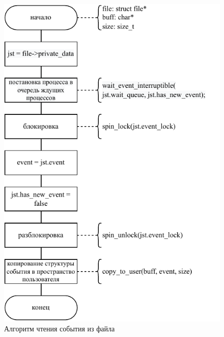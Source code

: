 \begin{figure}[ht]
    \centering
    \includegraphics[keepaspectratio,width=\linewidth,height=0.85\textheight]{img/proc-read.pdf}
    \caption{Алгоритм чтения события из файла}
    \label{alg:proc-read}
\end{figure}


\pagebreak
